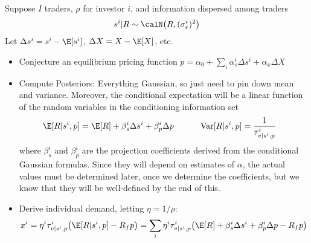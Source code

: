 \documentclass[12pt]{article}
\theoremstyle{plain}
\theoremstyle{definition}
\theoremstyle{remark}
\newcommand{\Var}{\operatorname{Var}}
\begin{document}
Suppose $I$ traders, $\rho$ for investor $i$, and information
dispersed among traders
\begin{align*}
  s^i|R \sim \calN\big(R,(\sigma_\varepsilon^i)^2\big)
\end{align*}
Let $\Delta s^i = s^i-\E[s^i]$, $\Delta X = X-\E[X]$, etc.
\begin{itemize}
  \item
    Conjecture an equilibrium pricing function
    $p = \alpha_0 + \sum_i\alpha_s^i \Delta s^i + \alpha_x \Delta X$

  \item
    Compute Posteriors:
    Everything Gaussian, so just need to pin down mean and variance.
    Moreover, the conditional expectation will be a linear function of
    the random variables in the conditioning information set
    \begin{align*}
      \E[R|s^i,p]
      &=
      \E[R]
      + \beta_s^i \Delta s^i
      + \beta_p^i \Delta p
      \quad\qquad
      \Var[R|s^i,p]
      =
      \frac{1}{\tau^i_{v|s^i,p}}
    \end{align*}
    where $\beta_s^i$ and $\beta_p^i$ are the projection coefficients
    derived from the conditional Gaussian formulas.
    Since they will depend on estimates of $\alpha$, the actual values
    must be determined later, once we determine the coefficients, but we
    know that they will be well-defined by the end of this.

  \item
    Derive individual demand, letting $\eta=1/\rho$:
    \begin{align*}
      x^i
      =
      \eta^i \tau^i_{v|s^i,p}
      \big(
        \E[R|s^i,p]
        - R_fp
      \big)
      =
      \sum_i
      \eta^i \tau^i_{v|s^i,p}
      \big(
        \E[R]
        + \beta_s^i \Delta s^i
        + \beta_p^i \Delta p
        - R_fp
      \big)
    \end{align*}


\end{itemize}
\end{document}
